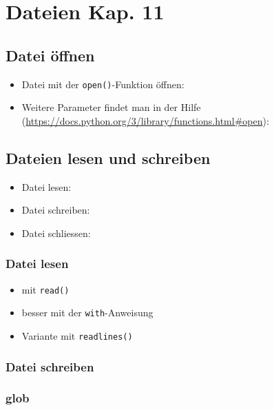 \section[Dateien]{Dateien \tiny{Kap. 11}}

\subsection{Datei öffnen}
\begin{itemize}
	\item Datei mit der \texttt{open()}-Funktion öffnen:
	
	\item Weitere Parameter findet man in der Hilfe (\url{https://docs.python.org/3/library/functions.html#open}):
	
\end{itemize}

\subsection{Dateien lesen und schreiben}
\begin{itemize}
	\item Datei lesen:
	
	\item Datei schreiben:
	
	\item Datei schliessen:
	
\end{itemize}

\subsubsection{Datei lesen}
\begin{itemize}
	\item mit \texttt{read()}
	
	\item besser mit der \texttt{with}-Anweisung
	
	\item Variante mit \texttt{readlines()}
	
\end{itemize}

\subsubsection{Datei schreiben}


\subsubsection{glob}


